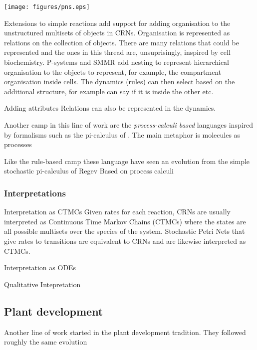 \documentclass[phd]{infthesis}
\begin{document}
\begin{center}
    \texttt{[image: figures/pns.eps]}
\end{center}

Extensions to simple reactions add support for adding organisation to the unstructured
multisets of objects in CRNs. Organisation is represented as relations on the
collection of objects. There are many relations that could be represented and
the ones in this thread are, unsuprisingly, inspired by cell biochemistry.
P-systems and SMMR add nesting to represent hierarchical organisation to
the objects to represent, for example, the compartment organisation inside
cells. The dynamics (rules) can then select based on the additional structure,
for example can say if it is inside the other etc.



Adding attributes
Relations can also be represented in the dynamics.



Another camp in this line of work are the \emph{process-calculi based} languages
inspired by formalisms such as the pi-calculus of
\cite{milner1999communicating}. The main metaphor is molecules as processes

Like the rule-based
camp these language have seen an evolution from the simple stochastic
pi-calculus of Regev
Based on process calculi



\subsubsection*{Interpretations}
Interpretation as CTMCs
Given rates for each reaction, CRNs are usually
interpreted as Continuous Time Markov Chains (CTMCs) where the states are all
possible multisets over the species of the system. Stochastic Petri Nets that give
rates to transitions are equivalent to CRNs and are likewise interpreted as
CTMCs.

Interpretation as ODEs

Qualitative Intepretation

\subsection{Plant development}
Another line of work started in the plant development tradition.
They followed roughly the same evolution
\end{document}
